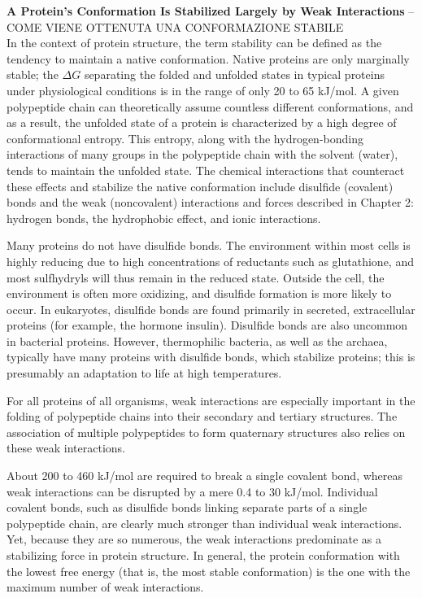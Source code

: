 \textbf{A Protein’s Conformation Is Stabilized Largely by Weak Interactions} -- COME VIENE OTTENUTA UNA CONFORMAZIONE STABILE\\
In the context of protein structure, the term stability can be defined as the tendency to maintain a native conformation. Native proteins are only marginally stable; the $\Delta G$ separating the folded and unfolded states in typical proteins under physiological conditions is in the range of only 20 to 65 kJ/mol. A given polypeptide chain can theoretically assume countless different conformations, and as a result, the unfolded state of a protein is characterized by a high degree of conformational entropy. This entropy, along with the hydrogen-bonding interactions of many groups in the polypeptide chain with the solvent (water), tends to maintain the unfolded state. 
The chemical interactions that counteract these effects and stabilize the native conformation include disulfide (covalent) bonds and the weak (noncovalent) interactions and forces described in Chapter 2: hydrogen bonds, the hydrophobic effect, and ionic interactions. 

Many proteins do not have disulfide bonds. The environment within most cells is highly reducing due to high concentrations of reductants such as glutathione, and most sulfhydryls will thus remain in the reduced state. Outside the cell, the environment is often more oxidizing, and disulfide formation is more likely to occur. In eukaryotes, disulfide bonds are found primarily in secreted, extracellular proteins (for example, the hormone insulin). Disulfide bonds are also uncommon in bacterial proteins. However, thermophilic bacteria, as well as the archaea, typically have many proteins with disulfide bonds, which stabilize proteins; this is presumably an adaptation to life at high temperatures. 

For all proteins of all organisms, weak interactions are especially important in the folding of polypeptide chains into their secondary and tertiary structures. The association of multiple polypeptides to form quaternary structures also relies on these weak interactions. 

About 200 to 460 kJ/mol are required to break a single covalent bond, whereas weak interactions can be disrupted by a mere 0.4 to 30 kJ/mol. Individual covalent bonds, such as disulfide bonds linking separate parts of a single polypeptide chain, are clearly much stronger than individual weak interactions. 
Yet, because they are so numerous, the weak interactions predominate as a stabilizing force in protein structure. In general, the protein conformation with the lowest free energy (that is, the most stable conformation) is the one with the maximum number of weak interactions. 

